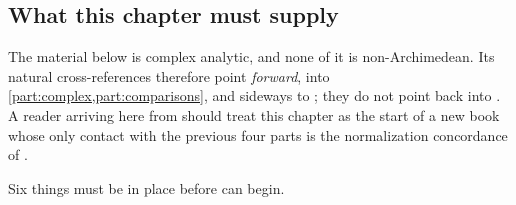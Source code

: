 \subsection{What this chapter must supply}
\label{sec:ch51-what}

The material below is complex analytic, and none of it is
non-Archimedean.  Its natural cross-references therefore point
\emph{forward}, into \cref{part:complex,part:comparisons}, and sideways to
; they do not point back into
.  A reader arriving here from
 should treat this chapter as the start of a new
book whose only contact with the previous four parts is the normalization
concordance of .

Six things must be in place before  can begin.

